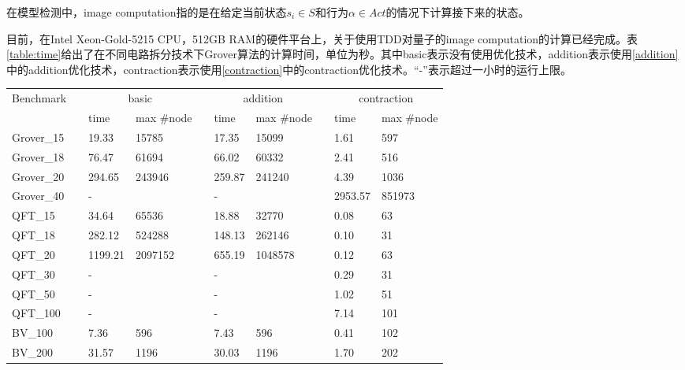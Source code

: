 在模型检测中，image computation指的是在给定当前状态$s_i\in S$和行为$\alpha\in Act$的情况下计算接下来的状态。

目前，在Intel Xeon-Gold-5215 CPU，512GB RAM的硬件平台上，关于使用TDD对量子的image computation的计算已经完成。表\ref{table:time}给出了在不同电路拆分技术下Grover算法的计算时间，单位为秒。其中basic表示没有使用优化技术，addition表示使用\ref{addition}中的addition优化技术，contraction表示使用\ref{contraction}中的contraction优化技术。“-”表示超过一小时的运行上限。
\begin{table}[!htbp]
    \centering
    \begin{tabular}{llllllllll}
        \hline
        \multirow{2}{*}{Benchmark} &  & \multicolumn{2}{c}{basic} &  & \multicolumn{2}{c}{addition} &  & \multicolumn{2}{c}{contraction} \\ \cline{3-4} \cline{6-7} \cline{9-10} 
                                   &  & time        & max \#node       &  & time          & max \#node        &  & time           & max \#node          \\ \hline
        Grover\_15 &   & 19.33  & 15785     &   & 17.35      & 15099  & & 1.61 & 597  \\
        Grover\_18 &   & 76.47  & 61694     &   & 66.02      & 60332  & & 2.41 & 516  \\
        Grover\_20 &   & 294.65 & 243946    &   & 259.87     & 241240 & & 4.39  & 1036 \\ 
        Grover\_40 &   & -      &           &   & -          &        & & 2953.57 & 851973 \\
        \hline
        QFT\_15     &  & 34.64   & 65536   &  & 18.88  & 32770   &  & 0.08 & 63  \\
        QFT\_18     &  & 282.12  & 524288  &  & 148.13 & 262146 &   & 0.10  & 31  \\
        QFT\_20     &  & 1199.21 & 2097152 &  & 655.19 & 1048578 &  & 0.12 & 63  \\
        QFT\_30     &  & -       &         &  & -      &        &  & 0.29 & 31  \\
        QFT\_50     &  & -       &         &  & -      &        &  & 1.02 & 51  \\
        QFT\_100    &  & -       &         &  & -      &        &  & 7.14 & 101 \\
        \hline
        BV\_100     &  & 7.36    & 596     &  & 7.43      & 596     &  & 0.41           & 102 \\
        BV\_200     &  & 31.57   & 1196    &  & 30.03     & 1196    &  & 1.70           & 202 \\

\end{tabular}
\end{table}
